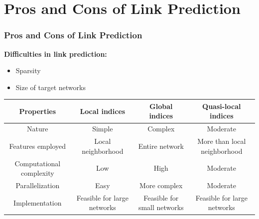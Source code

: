 \documentclass{beamer}
\begin{document}
\section{Pros and Cons of Link Prediction}
\begin{frame}
  \frametitle{Pros and Cons of Link Prediction}
  \textbf{Difficulties in link prediction:} 
  \begin{itemize}
      \item Sparsity  \\
      \item Size of target networks \\
  \end{itemize}
  \bigskip
  
\resizebox{10.2cm}{1.2cm}
{
\begin{tabular}{c|ccc}
\hline
    Properties & Local indices & Global indices & Quasi-local indices\\
\hline
    Nature & Simple & Complex & Moderate\\
    Features employed & Local neighborhood & Entire network & More than local neighborhood\\
    Computational complexity & Low & High & Moderate\\
    Parallelization & Easy & More complex & Moderate\\
    Implementation & Feasible for large networks & Feasible for small networks & Feasible for large networks\\
\hline
\end{tabular}
}
  
\end{frame}
\end{document}
